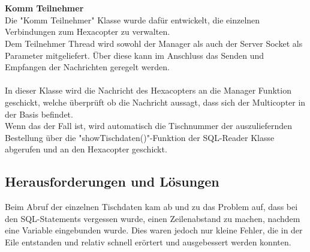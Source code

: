 \\ \\
\textbf{Komm Teilnehmer}\\
Die "Komm Teilnehmer" Klasse wurde dafür entwickelt, die einzelnen Verbindungen zum Hexacopter zu verwalten.
\\
Dem Teilnehmer Thread wird sowohl der Manager als auch der Server Socket als Parameter mitgeliefert. Über diese kann im Anschluss das Senden und Empfangen der Nachrichten geregelt werden.
\\ \\
In dieser Klasse wird die Nachricht des Hexacopters an die Manager Funktion geschickt, welche überprüft ob die Nachricht aussagt, dass sich der Multicopter in der Basis befindet. 
\\
Wenn das der Fall ist, wird automatisch die Tischnummer der auszuliefernden Bestellung über die "showTischdaten()"-Funktion der SQL-Reader Klasse abgerufen und an den Hexacopter geschickt.

  \subsection{Herausforderungen und Lösungen}
Beim Abruf der einzelnen Tischdaten kam ab und zu das Problem auf, dass bei den SQL-Statements vergessen wurde, einen Zeilenabstand zu machen, nachdem eine Variable eingebunden wurde. Dies waren jedoch nur kleine Fehler, die in der Eile entstanden und relativ schnell erörtert und ausgebessert werden konnten.
